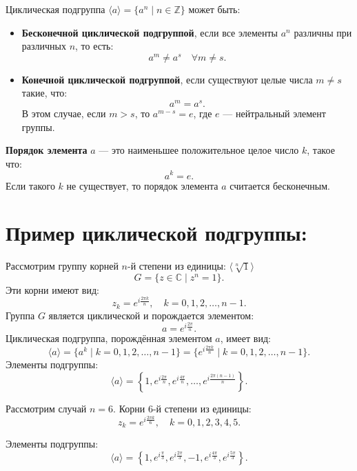\begin{shdef}
    \begin{definition} 
    \leavevmode \nl

    Циклическая подгруппа \( \langle a \rangle = \{ a^n \mid n \in \mathbb{Z} \} \) может быть:
    \begin{itemize}
        \item \textbf{Бесконечной циклической подгруппой}, если все элементы \( a^n \) различны при различных \( n \), то есть:
        \[
        a^m \neq a^s \quad \forall m \neq s.
        \]

        \item \textbf{Конечной циклической подгруппой}, если существуют целые числа \( m \neq s \) такие, что:
        \[
        a^m = a^s.
        \]
        В этом случае, если \( m > s \), то \( a^{m-s} = e \), где \( e \) — нейтральный элемент группы.
    \end{itemize}

    \textbf{Порядок элемента} \( a \) — это наименьшее положительное целое число \( k \), такое что:
    \[
    a^k = e.
    \]
    Если такого \( k \) не существует, то порядок элемента \( a \) считается бесконечным.
    \end{definition}
\end{shdef}


\section*{Пример циклической подгруппы: }

Рассмотрим группу корней \( n \)-й степени из единицы: \(\langle \sqrt[n]{1} \rangle \)
\[
G = \{ z \in \mathbb{C} \mid z^n = 1 \}.
\]
Эти корни имеют вид:
\[
z_k = e^{i \frac{2\pi k}{n}}, \quad k = 0, 1, 2, \dots, n-1.
\]
Группа \( G \) является циклической и порождается элементом:
\[
a = e^{i \frac{2\pi}{n}}.
\]
Циклическая подгруппа, порождённая элементом \( a \), имеет вид:
\[
\langle a \rangle = \{ a^k \mid k = 0, 1, 2, \dots, n-1 \} = \{ e^{i \frac{2\pi k}{n}} \mid k = 0, 1, 2, \dots, n-1 \}.
\]
Элементы подгруппы:
\[
\langle a \rangle = \left\{ 1, e^{i \frac{2\pi}{n}}, e^{i \frac{4\pi}{n}}, \dots, e^{i \frac{2\pi (n-1)}{n}} \right\}.
\]

Рассмотрим случай \( n = 6 \). Корни 6-й степени из единицы:
\[
z_k = e^{i \frac{2\pi k}{6}}, \quad k = 0, 1, 2, 3, 4, 5.
\]

Элементы подгруппы:
\[
\langle a \rangle = \left\{ 1, e^{i \frac{\pi}{3}}, e^{i \frac{2\pi}{3}}, -1, e^{i \frac{4\pi}{3}}, e^{i \frac{5\pi}{3}} \right\}.
\]



